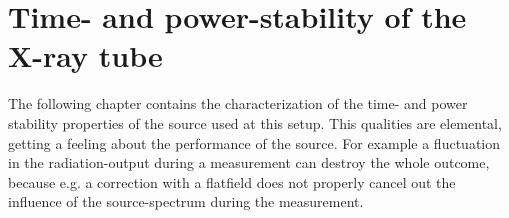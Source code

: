 \chapter[Time- Power-Stability]{Time- and power-stability of the X-ray tube}\label{chap:tps}
The following chapter contains the characterization of the time- and power stability properties of the source used at this setup. This qualities are elemental, getting a feeling about the performance of the source. For example a fluctuation in the radiation-output during a measurement can destroy the whole outcome, because e.g. a correction with a flatfield does not properly cancel out the influence of the source-spectrum during the measurement.   
